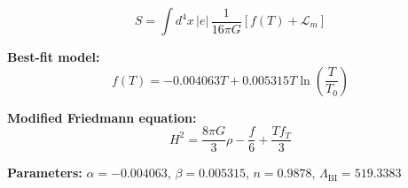 
\begin{equation}
  S = \int d^4x \, |e| \, \frac{1}{16\pi G} \left[ f(T) + \mathcal{L}_m \right]
\end{equation}

\textbf{Best-fit model:}
\begin{equation}
  f(T) = -0.004063 T + 0.005315 T \ln\!\left(\frac{T}{T_0}\right)
\end{equation}

\textbf{Modified Friedmann equation:}
\begin{equation}
  H^2 = \frac{8\pi G}{3} \rho - \frac{f}{6} + \frac{T f_T}{3}
\end{equation}

\textbf{Parameters:}
$\alpha = -0.004063$, \quad
$\beta = 0.005315$, \quad
$n = 0.9878$, \quad
$\Lambda_{\text{BI}} = 519.3383$